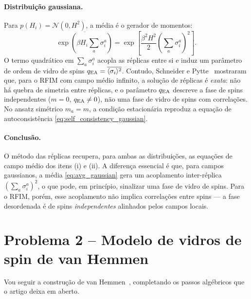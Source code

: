 \documentclass[12pt,a4paper]{article}
\begin{document}
\paragraph{Distribuição gaussiana.}
Para $p(H_i)=\mathcal{N}(0,H^2)$, a média é o gerador de momentos:
%
\begin{equation}
    \overline{\exp\!\left(\beta H_i\sum_a\sigma_i^a\right)}
    =
    \exp\!\left[\frac{\beta^2 H^2}{2}\!\left(\sum_a\sigma_i^a\right)^{\!2}\right].
    \label{eq:avg_gaussian}
\end{equation}
%
O termo quadrático em $\sum_a\sigma_i^a$ acopla as réplicas entre si
e induz um parâmetro de ordem de vidro de spins
$q_{\rm EA} = \overline{\langle\sigma_i\rangle^2}$.
Contudo, Schneider e Pytte~\cite{SchneiderPytte1977} mostraram que,
para o RFIM com campo médio infinito, a solução de réplicas é
\emph{exata}: não há quebra de simetria entre réplicas, e o parâmetro
$q_{\rm EA}$ descreve a fase de spins independentes ($m=0$, $q_{\rm EA}\neq0$),
não uma fase de vidro de spins com correlações.
No ansatz simétrico $m_a=m$, a condição estacionária reproduz
a equação de autoconsistência \eqref{eq:self_consistency_gaussian}.

\paragraph{Conclusão.}
O método das réplicas recupera, para ambas as distribuições, as equações
de campo médio dos itens (i) e (ii). A diferença essencial é que, para
campos gaussianos, a média \eqref{eq:avg_gaussian} gera um acoplamento
inter-réplica $(\sum_a\sigma_i^a)^2$, o que pode, em princípio,
sinalizar uma fase de vidro de spins. Para o RFIM, porém, esse acoplamento
não implica correlações entre spins — a fase desordenada é de spins
\emph{independentes} alinhados pelos campos locais.
%
\section*{Problema 2 -- Modelo de vidros de spin de van Hemmen}
Vou seguir a construção de van Hemmen~\cite{vanHemmen1982}, completando
os passos algébricos que o artigo deixa em aberto.
\end{document}
